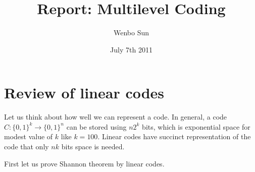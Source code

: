 \documentclass[12]{article}
\date{July 7th 2011}
\begin{document}
\large%
\title{Report: Multilevel Coding}
\author{Wenbo Sun}

\maketitle

\section*{Review of linear codes}
Let us think about how well we can represent a code. In general, a code $C : \{0,1\}^k\rightarrow\{0,1\}^n$ can be
stored using $n2^k$ bits, which is exponential space for modest value of $k$ like $k=100$. Linear codes have succinct
representation of the code that only $nk$ bits space is needed.

First let us prove Shannon theorem by linear codes.
\end{document}

